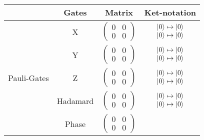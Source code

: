 \begin{table}[htp]
    \centering
    \begin{tabular}{c|c|cc}
                                 & Gates    & Matrix & Ket-notation \\ \hline
    \multirow{5}{*}{Pauli-Gates} & X        
                                    & $\begin{pmatrix} 0 & 0 \\ 0 & 0 \end{pmatrix}$       
                                    & $\begin{matrix} \ket{0} \mapsto \ket{0} \\ \ket{0} \mapsto \ket{0} \end{matrix}$            \\ \cline{2-4} 
                                 & Y        
                                    & $\begin{pmatrix} 0 & 0 \\ 0 & 0 \end{pmatrix}$       
                                    & $\begin{matrix} \ket{0} \mapsto \ket{0} \\ \ket{0} \mapsto \ket{0} \end{matrix}$             \\ \cline{2-4} 
                                 & Z        
                                    & $\begin{pmatrix} 0 & 0 \\ 0 & 0 \end{pmatrix}$       
                                    & $\begin{matrix} \ket{0} \mapsto \ket{0} \\ \ket{0} \mapsto \ket{0} \end{matrix}$             \\ \hline
                                 & Hadamard 
                                    & $\begin{pmatrix} 0 & 0 \\ 0 & 0 \end{pmatrix}$       
                                    & $\begin{matrix} \ket{0} \mapsto \ket{0} \\ \ket{0} \mapsto \ket{0} \end{matrix}$             \\ \hline
                                 & Phase    
                                    & $\begin{pmatrix} 0 & 0 \\ 0 & 0 \end{pmatrix}$       

\end{tabular}
\end{table}
